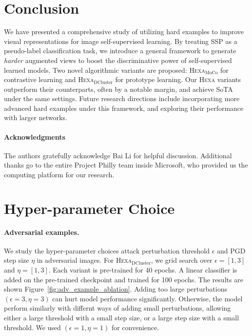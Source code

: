 \documentclass[10pt,twocolumn,letterpaper]{article}
\newcommand{\shortname}{\textsc{Hexa}}
\begin{document}
\section{Conclusion}
We have presented a comprehensive study of utilizing hard examples to improve visual representations for image self-supervised learning. By treating SSP as a pseudo-label classification task, we introduce a general framework to generate {\em harder} augmented views to boost the discriminative power of self-supervised learned models. Two novel algorithmic variants are proposed: \shortname{}$_{\text{MoCo}}$ for contrastive learning and \shortname{}$_{\text{DCluster}}$ for prototype learning. Our \shortname{} variants outperform their counterparts, often by a notable margin, and achieve SoTA under the same settings. Future research directions include incorporating more advanced hard examples under this framework, and exploring their performance with larger networks. 



\newpage

\paragraph{Acknowledgments}  The authors gratefully acknowledge Bai Li for
helpful discussion. Additional thanks go to the entire Project Philly team inside Microsoft, who provided us the computing platform for our research.

{\small


}



\appendix
\newpage









\section{Hyper-parameter Choice}

\paragraph{Adversarial examples.}
We study the hyper-parameter choices attack perturbation threshold $\epsilon$ and PGD step size $ \eta $  in adversarial images. For \shortname{}$_{\text{DCluster}}$, we grid search over $\epsilon = [1,3]$ and $ \eta  = [1,3]$. Each variant is pre-trained for 40 epochs. A linear classifier is added on the  pre-trained checkpoint and trained for 100 epochs. The results are shown Figure~\ref{fig:adv_example_ablation}. Adding too large perturbations  $(\epsilon = 3,  \eta  = 3)$ can hurt model performance significantly. Otherwise, the model perform similarly with differnt ways of adding small perturbations, allowing either a large threshold with a small step size, or a large step size with a small threshold. We used $(\epsilon = 1, \eta = 1)$ for convenience.
\end{document}
